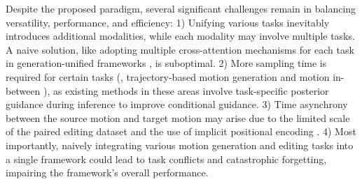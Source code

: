 \begin{table*}[!t]
\caption{Summary of different methods focusing on motion generation and editing. $\checkmark$ indicates that the method has been trained for the task, $\times$ indicates that the method has not been trained, and $-$ indicates that the method has not been trained but can be implemented in a zero-shot manner.}
\label{tab:comparison}
\vspace{-5mm}
\end{table*}

Despite the proposed paradigm, several significant challenges remain in balancing versatility, performance, and efficiency: 
1) Unifying various tasks inevitably introduces additional modalities, while each modality may involve multiple tasks. A naive solution, like adopting multiple cross-attention mechanisms for each task in generation-unified frameworks \cite{fan2024everything2motion,zhang2025large}, is suboptimal. 
2) More sampling time is required for certain tasks (\eg, trajectory-based motion generation and motion in-between \cite{xie2023omnicontrol,zhong2025smoodi}), as existing methods in these areas involve task-specific posterior guidance \cite{chung2022diffusion} during inference to improve conditional guidance.
3) Time asynchrony between the source motion and target motion may arise due to the limited scale of the paired editing dataset and the use of implicit positional encoding \cite{chen2023executing, xie2023omnicontrol,athanasiou2024motionfix,cohan2024flexible}.
4) Most importantly, naively integrating various motion generation and editing tasks into a single framework could lead to task conflicts and catastrophic forgetting, impairing the framework's overall performance.

